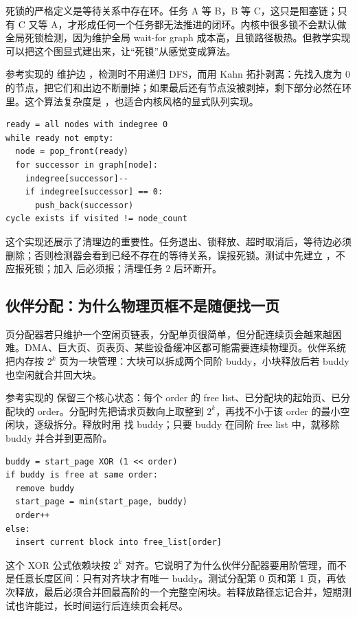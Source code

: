 死锁的严格定义是等待关系中存在环。任务 A 等 B，B 等 C，这只是阻塞链；只有 C 又等 A，才形成任何一个任务都无法推进的闭环。内核中很多锁不会默认做全局死锁检测，因为维护全局 wait-for graph 成本高，且锁路径极热。但教学实现可以把这个图显式建出来，让“死锁”从感觉变成算法。

参考实现的  维护边 ，检测时不用递归 DFS，而用 Kahn 拓扑剥离：先找入度为 0 的节点，把它们和出边不断删掉；如果最后还有节点没被剥掉，剩下部分必然在环里。这个算法复杂度是 ，也适合内核风格的显式队列实现。

\begin{lstlisting}
ready = all nodes with indegree 0
while ready not empty:
  node = pop_front(ready)
  for successor in graph[node]:
    indegree[successor]--
    if indegree[successor] == 0:
      push_back(successor)
cycle exists if visited != node_count
\end{lstlisting}

这个实现还展示了清理边的重要性。任务退出、锁释放、超时取消后，等待边必须删除；否则检测器会看到已经不存在的等待关系，误报死锁。测试中先建立 ，不应报死锁；加入  后必须报；清理任务 2 后环断开。

\subsection{伙伴分配：为什么物理页框不是随便找一页}

页分配器若只维护一个空闲页链表，分配单页很简单，但分配连续页会越来越困难。DMA、巨大页、页表页、某些设备缓冲区都可能需要连续物理页。伙伴系统把内存按 $2^k$ 页为一块管理：大块可以拆成两个同阶 buddy，小块释放后若 buddy 也空闲就合并回大块。

参考实现的  保留三个核心状态：每个 order 的 free list、已分配块的起始页、已分配块的 order。分配时先把请求页数向上取整到 $2^k$，再找不小于该 order 的最小空闲块，逐级拆分。释放时用  找 buddy；只要 buddy 在同阶 free list 中，就移除 buddy 并合并到更高阶。

\begin{lstlisting}
buddy = start_page XOR (1 << order)
if buddy is free at same order:
  remove buddy
  start_page = min(start_page, buddy)
  order++
else:
  insert current block into free_list[order]
\end{lstlisting}

这个 XOR 公式依赖块按 $2^k$ 对齐。它说明了为什么伙伴分配器要用阶管理，而不是任意长度区间：只有对齐块才有唯一 buddy。测试分配第 0 页和第 1 页，再依次释放，最后必须合并回最高阶的一个完整空闲块。若释放路径忘记合并，短期测试也许能过，长时间运行后连续页会耗尽。

